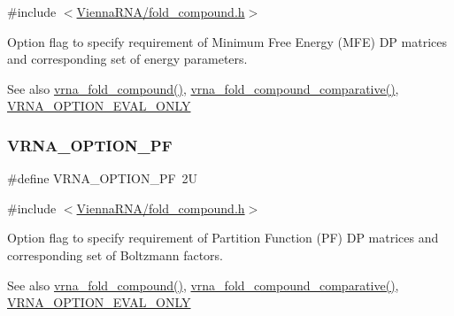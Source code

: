 {\ttfamily \#include $<$\mbox{\hyperlink{fold__compound_8h}{Vienna\+R\+N\+A/fold\+\_\+compound.\+h}}$>$}



Option flag to specify requirement of Minimum Free Energy (M\+FE) DP matrices and corresponding set of energy parameters. 

\begin{DoxySeeAlso}{See also}
\mbox{\hyperlink{group__fold__compound_ga6601d994ba32b11511b36f68b08403be}{vrna\+\_\+fold\+\_\+compound()}}, \mbox{\hyperlink{group__fold__compound_gad6bacc816af274922b13d947f708aa0c}{vrna\+\_\+fold\+\_\+compound\+\_\+comparative()}}, \mbox{\hyperlink{group__fold__compound_ga61469c423131552c8483229f8b6c7e0e}{V\+R\+N\+A\+\_\+\+O\+P\+T\+I\+O\+N\+\_\+\+E\+V\+A\+L\+\_\+\+O\+N\+LY}} 
\end{DoxySeeAlso}
\mbox{\label{group__fold__compound_gabfbadcddda3e74ce7f49035ef8f058f7}} 
\subsubsection{\texorpdfstring{VRNA\_OPTION\_PF}{VRNA\_OPTION\_PF}}
{\footnotesize\ttfamily \#define V\+R\+N\+A\+\_\+\+O\+P\+T\+I\+O\+N\+\_\+\+PF~2U}



{\ttfamily \#include $<$\mbox{\hyperlink{fold__compound_8h}{Vienna\+R\+N\+A/fold\+\_\+compound.\+h}}$>$}



Option flag to specify requirement of Partition Function (PF) DP matrices and corresponding set of Boltzmann factors. 

\begin{DoxySeeAlso}{See also}
\mbox{\hyperlink{group__fold__compound_ga6601d994ba32b11511b36f68b08403be}{vrna\+\_\+fold\+\_\+compound()}}, \mbox{\hyperlink{group__fold__compound_gad6bacc816af274922b13d947f708aa0c}{vrna\+\_\+fold\+\_\+compound\+\_\+comparative()}}, \mbox{\hyperlink{group__fold__compound_ga61469c423131552c8483229f8b6c7e0e}{V\+R\+N\+A\+\_\+\+O\+P\+T\+I\+O\+N\+\_\+\+E\+V\+A\+L\+\_\+\+O\+N\+LY}} 
\end{DoxySeeAlso}
\mbox{\label{group__fold__compound_ga61469c423131552c8483229f8b6c7e0e}} 
